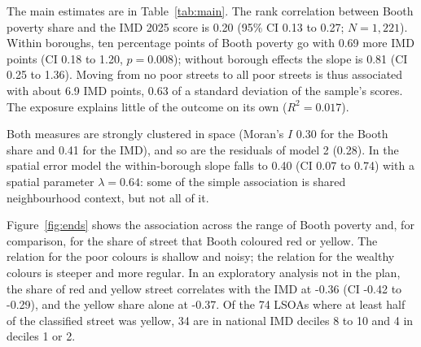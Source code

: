 \documentclass[11pt,a4paper]{article}
\begin{document}
The main estimates are in Table~\ref{tab:main}. The rank correlation between Booth poverty share and the IMD 2025 score is 0.20 (95\% CI 0.13 to 0.27; $N=1,221$). Within boroughs, ten percentage points of Booth poverty go with 0.69 more IMD points (CI 0.18 to 1.20, $p=0.008$); without borough effects the slope is 0.81 (CI 0.25 to 1.36). Moving from no poor streets to all poor streets is thus associated with about 6.9 IMD points, 0.63 of a standard deviation of the sample's scores. The exposure explains little of the outcome on its own ($R^2=0.017$).

\begin{table}[tbp]\centering\small\caption{Main estimates. Outcome: IMD 2025 score. Exposure: Booth poverty share (black, dark blue, light blue) per 10 percentage points. (1) Spearman rank correlation, 95\% interval from a 1~km block bootstrap (2,000 replicates). (2) OLS without and (3) with borough fixed effects, standard errors clustered by MSOA. (4) Spatial error model with borough dummies, 8 nearest neighbours.}\label{tab:main}\end{table}

Both measures are strongly clustered in space (Moran's $I$ 0.30 for the Booth share and 0.41 for the IMD), and so are the residuals of model 2 (0.28). In the spatial error model the within-borough slope falls to 0.40 (CI 0.07 to 0.74) with a spatial parameter $\lambda=0.64$: some of the simple association is shared neighbourhood context, but not all of it.

Figure~\ref{fig:ends} shows the association across the range of Booth poverty and, for comparison, for the share of street that Booth coloured red or yellow. The relation for the poor colours is shallow and noisy; the relation for the wealthy colours is steeper and more regular. In an exploratory analysis not in the plan, the share of red and yellow street correlates with the IMD at -0.36 (CI -0.42 to -0.29), and the yellow share alone at -0.37. Of the 74 LSOAs where at least half of the classified street was yellow, 34 are in national IMD deciles 8 to 10 and 4 in deciles 1 or 2.
\end{document}
